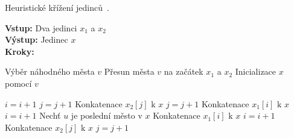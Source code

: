 \begin{algorithm}[H]
	\caption{Heuristické křížení jedinců~\cite{PSO_GA_TSP}.}
	\label{alg:diskretniPSO}
	\hspace*{\algorithmicindent} \textbf{Vstup:} Dva jedinci $x_1$ a $x_2$\\
    \hspace*{\algorithmicindent} \textbf{Výstup:} Jedinec $x$\\
    \hspace*{\algorithmicindent} \textbf{Kroky:}
	\begin{algorithmic}[1]
	    \State Výběr náhodného města $v$
	    \State Přesun města $v$ na začátek $x_1$ a $x_2$
	    \State Inicializace $x$ pomocí $v$

			    \State $i = i + 1$
			    \State $j = j + 1$
			    \State Konkatenace $x_2[j] \text{ k } x$
			    \State $j = j + 1$
			    \State Konkatenace $x_1[i] \text{ k } x$
			    \State $i = i + 1$
			\Else
			    \State Nechť $u$ je poslední město v $x$
			        \State Konkatenace $x_1[i] \text{ k } x$
			        \State $i = i + 1$
			    \Else
			        \State Konkatenace $x_2[j] \text{ k } x$
			        \State $j = j + 1$
			    \EndIf
			\EndIf
		\EndFor
	\end{algorithmic} 
\end{algorithm}

